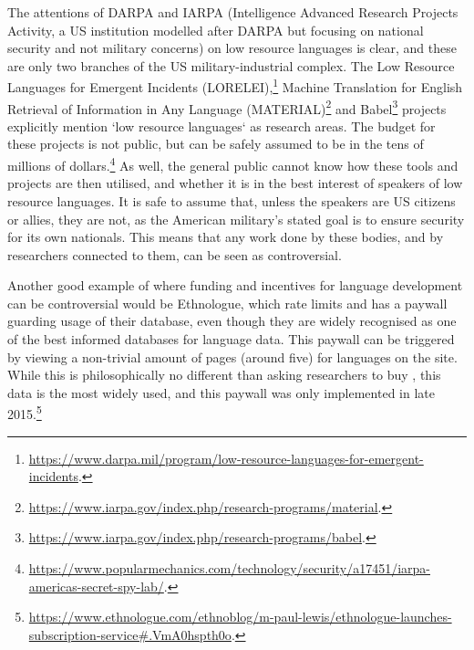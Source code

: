The attentions of DARPA and IARPA (Intelligence Advanced Research Proj\-ects Activity, a US institution modelled after DARPA but focusing on national security and not military concerns) on low resource languages is clear, and these are only two branches of the US military-industrial complex. The Low Resource Languages for Emergent Incidents (LORELEI),\footnote{\href{https://www.darpa.mil/program/low-resource-languages-for-emergent-incidents}{https://www.darpa.mil/program/low-resource-languages-for-emergent-incidents}. } Machine Translation for English Retrieval of Information in Any Language (MATERIAL)\footnote{\href{https://www.iarpa.gov/index.php/research-programs/material}{https://www.iarpa.gov/index.php/research-programs/material}. } and Babel\footnote{\href{https://www.iarpa.gov/index.php/research-programs/babel}{https://www.iarpa.gov/index.php/research-programs/babel}. } projects explicitly mention `low resource languages` as research areas. The budget for these projects is not public, but can be safely assumed to be in the tens of millions of dollars.\footnote{\href{https://www.popularmechanics.com/technology/security/a17451/iarpa-americas-secret-spy-lab/}{https://www.popularmechanics.com/technology/security/a17451/iarpa-americas-secret-spy-lab/}. } As well, the general public cannot know how these tools and projects are then utilised, and whether it is in the best interest of speakers of low resource languages. It is safe to assume that, unless the speakers are US citizens or allies, they are not, as the American military's stated goal is to ensure security for its own nationals. This means that any work done by these bodies, and by researchers connected to them, can be seen as controversial.

Another good example of where funding and incentives for language development can be controversial would be Ethnologue, which rate limits and has a paywall guarding usage of their database, even though they are widely recognised as one of the best informed databases for language data. This paywall can be triggered by viewing a non-trivial amount of pages (around five) for languages on the site. While this is philosophically no different than asking researchers to buy \citet{lewis2009ethnologue}, this data is the most widely used, and this paywall was only implemented in late 2015.\footnote{\href{https://www.ethnologue.com/ethnoblog/m-paul-lewis/ethnologue-launches-subscription-service\#.VmA0hspth0o}{https://www.ethnologue.com/ethnoblog/m-paul-lewis/ethnologue-launches-subscription-service\#.VmA0hspth0o}. }

